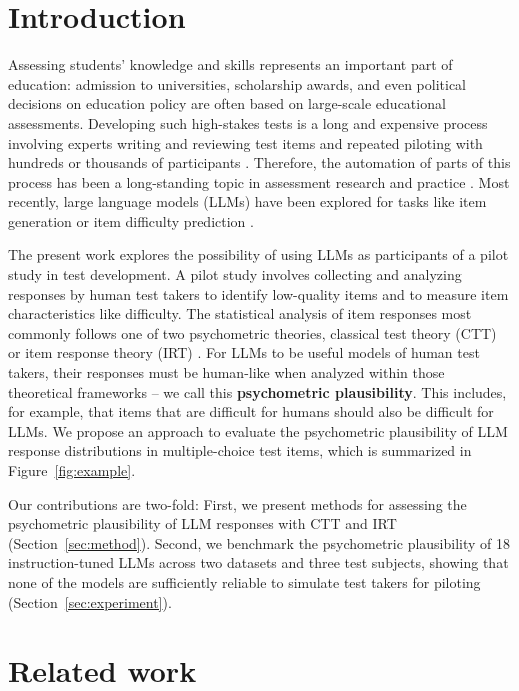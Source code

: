 \documentclass[11pt]{article}
\begin{document}
\section{Introduction}
\label{sec:introduction}

Assessing students' knowledge and skills represents an important part of education: admission to universities, scholarship awards, and even political decisions on education policy are often based on large-scale educational assessments. Developing such high-stakes tests is a long and expensive process involving experts writing and reviewing test items and repeated piloting with hundreds or thousands of participants \citep{Green2020,Papageorgiou2021}. Therefore, the automation of parts of this process has been a long-standing topic in assessment research and practice \citep{Haladyna2013,Kurdi2019}. Most recently, large language models (LLMs) have been explored for tasks like item generation or item difficulty prediction \citep{Attali2022,Yaneva2024,Owan2023,May2025}.

The present work explores the possibility of using LLMs as participants of a pilot study in test development. A pilot study involves collecting and analyzing responses by human test takers to identify low-quality items and to measure item characteristics like difficulty. The statistical analysis of item responses most commonly follows one of two psychometric theories, classical test theory (CTT) or item response theory (IRT) \citep{Chang2021}. For LLMs to be useful models of human test takers, their responses must be human-like when analyzed within those theoretical frameworks -- we call this \textbf{psychometric plausibility}. This includes, for example, that items that are difficult for humans should also be difficult for LLMs. We propose an approach to evaluate the psychometric plausibility of LLM response distributions in multiple-choice test items, which is summarized in Figure~\ref{fig:example}.

Our contributions are two-fold: First, we present methods for assessing the psychometric plausibility of LLM responses with CTT and IRT (Section~\ref{sec:method}). Second, we benchmark the psychometric plausibility of 18 instruction-tuned LLMs across two datasets and three test subjects, showing that none of the models are sufficiently reliable to simulate test takers for piloting (Section~\ref{sec:experiment}).

\section{Related work}
\end{document}
